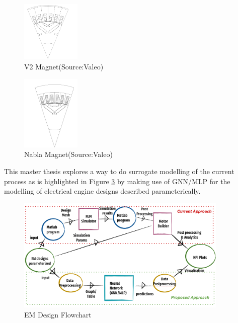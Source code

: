 \documentclass{report} %
\begin{document}
\begin{figure}[h]
    \centering
    \includegraphics[width=0.25\textwidth]{./ReportImages/2V_Magnet.png}
    \caption{V2 Magnet(Source:Valeo)}
    \label{fig:V2 Magnet}
\end{figure}

\begin{figure}[h]
    \centering
    \includegraphics[width=0.25\textwidth]{./ReportImages/Nabla_Magnet.png}
    \caption{Nabla Magnet(Source:Valeo)}
    \label{fig:Nabla Magnet}
\end{figure}

This master thesis explores a way to do surrogate modelling of the current process as is highlighted in Figure \ref{fig:EM Design Flowchart} by making use of GNN/MLP for the modelling of electrical engine designs described parameterically. \\
\begin{figure}[h]
    \centering
    \includegraphics[width=0.9\textwidth]{./ReportImages/EM_design_flowchart_v2.png} 
    \caption{EM Design Flowchart}
    \label{fig:EM Design Flowchart}
\end{figure}
\end{document}
